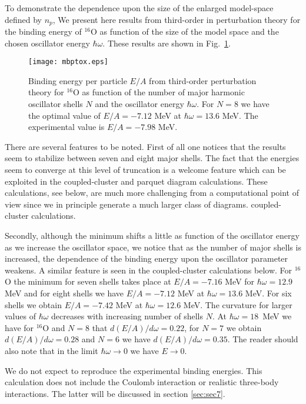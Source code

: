 \documentclass[twoside,12pt]{article}
\begin{document}
To demonstrate the dependence upon the size of the enlarged model-space
defined by $n_p$, 
We present here results from third-order in perturbation theory for the 
binding energy of $^{16}$O as function of the size of the model
space and the chosen oscillator energy $\hbar\omega$.
These results are shown in Fig.~\ref{fig:mbptox}. 
\begin{figure}
\begin{center}
\texttt{[image: mbptox.eps]}
\caption{Binding energy per particle $E/A$ 
from third-order perturbation theory for $^{16}$O as function 
of the number of major harmonic oscillator shells $N$ 
and the oscillator energy $\hbar\omega$. For $N=8$ we have the optimal value of
$E/A=-7.12$ MeV at $\hbar\omega = 13.6$ MeV. The experimental value is
$E/A=-7.98$ MeV.}
\label{fig:mbptox}
\end{center}
\end{figure}

There are several features to be noted. First of all one notices that the results 
seem to stabilize between seven and eight  
major shells. 
The fact that the energies seem to converge at this level of truncation is a welcome
feature which can be exploited in the coupled-cluster and parquet diagram 
calculations. These calculations,
see below, are much more challenging from a computational point of view since we in principle
generate a much larger class of diagrams. 
coupled-cluster calculations. 

Secondly, although the minimum shifts a little 
as function of the oscillator energy as we increase the
oscillator space, we notice
that as the number of major shells is increased, the 
dependence of the binding energy 
upon the oscillator parameter weakens. A similar 
feature is seen in the coupled-cluster calculations
below.  
For $^{16}$O the minimum for seven shells 
takes place at $E/A=-7.16$ MeV for $\hbar\omega = 12.9$ MeV 
and for eight shells we have   $E/A=-7.12$ MeV at $\hbar\omega = 13.6$ MeV. For six shells
we obtain  $E/A=-7.42$ MeV at $\hbar\omega = 12.6$ MeV. 
The curvature for larger values of $\hbar\omega$ decreases with increasing number of shells $N$.
At $\hbar\omega =18$~MeV we have for $^{16}$O and $N=8$ that $d(E/A)/d\omega=0.22$, for 
$N=7$ we obtain $d(E/A)/d\omega=0.28$
and $N=6$ we have $d(E/A)/d\omega=0.35$. 
The reader should also note that 
in the limit $\hbar\omega \rightarrow 0$ we have
$E\rightarrow 0$.  

We do not expect to reproduce the experimental binding energies. This calculation
does not include the Coulomb interaction or realistic three-body interactions.
The latter will be discussed in section \ref{sec:sec7}.
\end{document}
